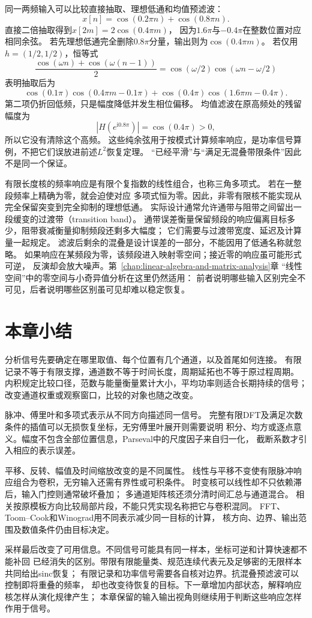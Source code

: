 同一两频输入可以比较直接抽取、理想低通和均值预滤波：
\[
  x[n]=\cos(0.2\pi n)+\cos(0.8\pi n).
\]
直接二倍抽取得到$x[2m]=2\cos(0.4\pi m)$，
因为$1.6\pi$与$-0.4\pi$在整数位置对应相同余弦。
若先理想低通完全删除$0.8\pi$分量，输出则为$\cos(0.4\pi m)$。
若仅用$h=(1/2,1/2)$，恒等式
\[
  \frac{\cos(\omega n)+\cos(\omega(n-1))}{2}
  =\cos(\omega/2)\cos(\omega n-\omega/2)
\]
表明抽取后为
\[
  \cos(0.1\pi)\cos(0.4\pi m-0.1\pi)
  +\cos(0.4\pi)\cos(1.6\pi m-0.4\pi).
\]
第二项仍折回低频，只是幅度降低并发生相位偏移。
均值滤波在原高频处的残留幅度为
\[
 |H(e^{\mathrm i0.8\pi})|=\cos(0.4\pi)>0,
\]
所以它没有清除这个高频。
这些纯余弦用于按模式计算频率响应，是功率信号算例，不把它们误放进前述$L^2$恢复定理。
“已经平滑”与“满足无混叠带限条件”因此不是同一个保证。

有限长度核的频率响应是有限个复指数的线性组合，也称三角多项式。
若在一整段频率上精确为零，就会迫使对应
多项式恒为零。因此，非零有限核不能实现从完全保留突变到完全抑制的理想低通。
实际设计通常允许通带与阻带之间留出一段缓变的过渡带（transition band）。
通带误差衡量保留频段的响应偏离目标多少，阻带衰减衡量抑制频段还剩多大幅度；
它们需要与过渡带宽度、延迟及计算量一起规定。
滤波后剩余的混叠是设计误差的一部分，不能因用了低通名称就忽略。
如果响应在某频段为零，该频段进入映射零空间；接近零的响应虽可能形式可逆，
反演却会放大噪声。第~\ref{chap:linear-algebra-and-matrix-analysis}章
“线性空间”中的零空间与小奇异值分析在这里仍然适用：
前者说明哪些输入区别完全不可见，后者说明哪些区别虽可见却难以稳定恢复。

\section{本章小结}
\label{sec:signal-analysis-summary}

分析信号先要确定在哪里取值、每个位置有几个通道，以及首尾如何连接。
有限记录不等于有限支撑，通道数不等于时间长度，周期延拓也不等于原过程周期。
内积规定比较口径，范数与能量衡量累计大小，平均功率则适合长期持续的信号；
改变通道权重或观察窗口，比较的对象也随之改变。

脉冲、傅里叶和多项式表示从不同方向描述同一信号。
完整有限DFT及满足次数条件的插值可以无损恢复坐标，无穷傅里叶展开则需要说明
积分、均方或逐点意义。幅度不包含全部位置信息，Parseval中的尺度因子来自归一化，
截断系数才引入相应的表示误差。

平移、反转、幅值及时间缩放改变的是不同属性。
线性与平移不变使有限脉冲响应组合为卷积，无穷输入还需有界性或可积条件。
时变核可以线性却不只依赖滞后，输入门控则通常破坏叠加；
多通道矩阵核还须分清时间汇总与通道混合。
相关按原模板方向比较局部片段，不能只凭实现名称把它与卷积混同。
FFT、Toom--Cook和Winograd用不同表示减少同一目标的计算，
核方向、边界、输出范围及数值条件仍由目标决定。

采样最后改变了可用信息。不同信号可能具有同一样本，坐标可逆和计算快速都不能补回
已经消失的区别。带限有限能量类、规范连续代表元及足够密的无限样本共同给出sinc恢复；
有限记录和功率信号需要各自核对边界。抗混叠预滤波可以控制即将重叠的频率，
却也改变待恢复的目标。下一章增加内部状态，解释响应核怎样从演化规律产生；
本章保留的输入输出视角则继续用于判断这些响应怎样作用于信号。
